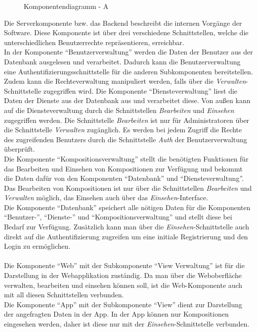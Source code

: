 \begin{figure}[h]
	\centering
	\caption{Komponentendiagramm - A}
	\label{fig:komponentendiagramm-a}
\end{figure}

\noindent
Die Serverkomponente bzw. das Backend beschreibt die internen Vorgänge der Software.
Diese Komponente ist über drei verschiedene Schnittstellen, welche die unterschiedlichen
Benutzerrechte repräsentieren, erreichbar.\\
In der Komponente ``Benutzerverwaltung'' werden die Daten der Benutzer aus der Datenbank ausgelesen und verarbeitet.
Dadurch kann die Benutzerverwaltung eine Authentifizierungsschnittstelle für die anderen Subkomponenten bereitstellen.
Zudem kann die Rechteverwaltung manipuliert werden, falls über die \textit{Verwalten}-Schnittstelle zugegriffen wird.
Die Komponente ``Diensteverwaltung'' liest die Daten der Dienste aus der Datenbank aus und verarbeitet diese.
Von außen kann auf die Diensteverwaltung durch die Schnittstellen \textit{Bearbeiten} und \textit{Einsehen} zugegriffen werden.
Die Schnittstelle \textit{Bearbeiten} ist nur für Administratoren über die Schnittstelle \textit{Verwalten} zugänglich.
Es werden bei jedem Zugriff die Rechte des zugreifenden Benutzers durch die Schnittstelle \textit{Auth} der Benutzerverwaltung überprüft.\\
Die Komponente ``Kompositionsverwaltung'' stellt die benötigten Funktionen für das Bearbeiten und Einsehen von Kompositionen zur Verfügung und bekommt die Daten dafür von den Komponenten ``Datenbank'' und ``Diensteverwaltung''.
Das Bearbeiten von Kompositionen ist nur über die Schnittstellen \textit{Bearbeiten} und \textit{Verwalten} möglich, das Einsehen auch über das \textit{Einsehen}-Interface.\\
Die Komponente ``Datenbank'' speichert alle nötigen Daten für die Komponenten ``Benutzer-'', ``Dienste-'' und ``Kompositionsverwaltung'' und stellt diese bei Bedarf zur Verfügung.
Zusätzlich kann man über die \textit{Einsehen}-Schnittstelle auch direkt auf die Authentifizierung zugreifen um eine initiale Registrierung und den Login zu ermöglichen.\\
\\
Die Komponente ``Web'' mit der Subkomponente ``View Verwaltung'' ist für die Darstellung in der Webapplikation zuständig.
Da man über die Weboberfläche verwalten, bearbeiten und einsehen können soll, ist die Web-Komponente auch mit all diesen Schnittstellen verbunden.\\
Die Komponente ``App'' mit der Subkomponente ``View'' dient zur Darstellung der angefragten Daten in der App.
In der App können nur Kompositionen eingesehen werden, daher ist diese nur mit der \textit{Einsehen}-Schnittstelle verbunden.
